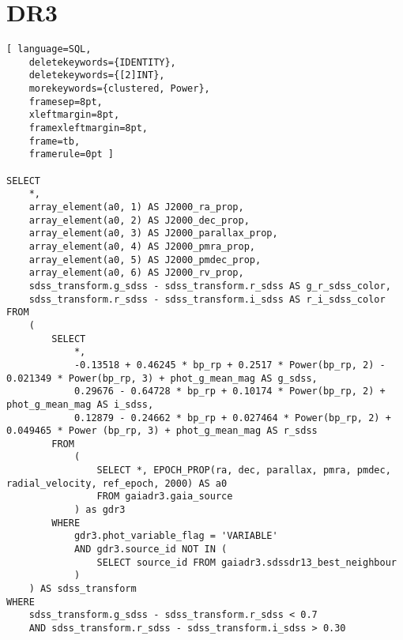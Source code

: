 \section{DR3}
\begin{lstlisting}[ language=SQL,
	deletekeywords={IDENTITY},
	deletekeywords={[2]INT},
	morekeywords={clustered, Power},
	framesep=8pt,
	xleftmargin=8pt,
	framexleftmargin=8pt,
	frame=tb,
	framerule=0pt ]

SELECT
    *,
    array_element(a0, 1) AS J2000_ra_prop,
    array_element(a0, 2) AS J2000_dec_prop,
    array_element(a0, 3) AS J2000_parallax_prop,
    array_element(a0, 4) AS J2000_pmra_prop,
    array_element(a0, 5) AS J2000_pmdec_prop,
    array_element(a0, 6) AS J2000_rv_prop,
    sdss_transform.g_sdss - sdss_transform.r_sdss AS g_r_sdss_color,
    sdss_transform.r_sdss - sdss_transform.i_sdss AS r_i_sdss_color
FROM
    (
        SELECT
            *,
            -0.13518 + 0.46245 * bp_rp + 0.2517 * Power(bp_rp, 2) - 0.021349 * Power(bp_rp, 3) + phot_g_mean_mag AS g_sdss,
            0.29676 - 0.64728 * bp_rp + 0.10174 * Power(bp_rp, 2) + phot_g_mean_mag AS i_sdss,
            0.12879 - 0.24662 * bp_rp + 0.027464 * Power(bp_rp, 2) + 0.049465 * Power (bp_rp, 3) + phot_g_mean_mag AS r_sdss
        FROM
            (
                SELECT *, EPOCH_PROP(ra, dec, parallax, pmra, pmdec, radial_velocity, ref_epoch, 2000) AS a0
                FROM gaiadr3.gaia_source
            ) as gdr3
        WHERE
            gdr3.phot_variable_flag = 'VARIABLE'
            AND gdr3.source_id NOT IN (
                SELECT source_id FROM gaiadr3.sdssdr13_best_neighbour
            )
    ) AS sdss_transform
WHERE
    sdss_transform.g_sdss - sdss_transform.r_sdss < 0.7
    AND sdss_transform.r_sdss - sdss_transform.i_sdss > 0.30

\end{lstlisting}